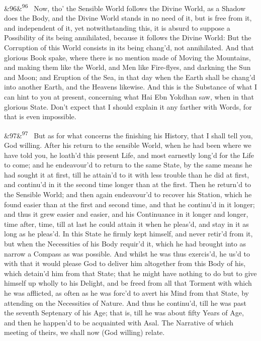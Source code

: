 \documentclass[12pt]{article}
\newcommand{\para}[1][]{\par\noindent\ifx&#1&\else\textsuperscript{\footnotesize #1}~\fi}
\begin{document}
\para[96] Now, tho' the Sensible World follows the Divine World, as a Shadow does the Body, and the Divine World stands in no need of it, but is free from it, and independent of it, yet notwithstanding this, it is absurd to suppose a Possibility of its being annihilated, because it follows the Divine World: But the Corruption of this World consists in its being chang'd, not annihilated. And that glorious Book spake, where there is no mention made of Moving the Mountains, and making them like the World, and Men like Fire-flyes, and darkning the Sun and Moon; and Eruption of the Sea, in that day when the Earth shall be chang'd into another Earth, and the Heavens likewise. And this is the Substance of what I can hint to you at present, concerning what Hai Ebn Yokdhan saw, when in that glorious State. Don't expect that I should explain it any farther with Words, for that is even impossible.

\para[97] But as for what concerns the finishing his History, that I shall tell you, God willing. After his return to the sensible World, when he had been where we have told you, he loath'd this present Life, and most earnestly long'd for the Life to come; and he endeavour'd to return to the same State, by the same means he had sought it at first, till he attain'd to it with less trouble than he did at first, and continu'd in it the second time longer than at the first. Then he return'd to the Sensible World; and then again endeavour'd to recover his Station, which he found easier than at the first and second time, and that he continu'd in it longer; and thus it grew easier and easier, and his Continuance in it longer and longer, time after, time, till at last he could attain it when he pleas'd, and stay in it as long as he pleas'd. In this State he firmly kept himself, and never retir'd from it, but when the Necessities of his Body requir'd it, which he had brought into as narrow a Compass as was possible. And whilst he was thus exercis'd, he us'd to with that it would please God to deliver him altogether from this Body of his, which detain'd him from that State; that he might have nothing to do but to give himself up wholly to his Delight, and be freed from all that Torment with which he was afflicted, as often as he was forc'd to avert his Mind from that State, by attending on the Necessities of Nature. And thus he continu'd, till he was past the seventh Septenary of his Age; that is, till he was about fifty Years of Age, and then he happen'd to be acquainted with Asal. The Narrative of which meeting of theirs, we shall now (God willing) relate.
\end{document}
